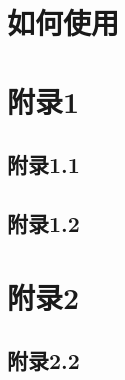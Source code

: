 \documentclass[en]{inkbook}
\begin{document}
    \chapter{如何使用}

    \appendix

    \chapter{附录1}

    \section{附录1.1}

    \lipsum[1-5]

    \section{附录1.2}

    \lipsum[1-5]

    \chapter{附录2}

    \section{附录2.2}

    \lipsum[2]
    
\end{document}

